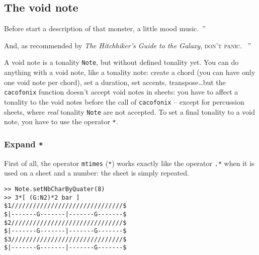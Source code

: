 \documentclass{article}
\newcommand{\note}{\lstinline!Note!\xspace}
\newenvironment{meenv}{ \par \noindent \makebox[6em][r]{ \textcolor{mecolor}{Me}: `` --~}}{~''}
\newenvironment{myselfenv}{ \par \noindent \makebox[6em][r]{ \textcolor{myselfcolor}{Myself}: `` --~}}{~''}
\newcommand{\me}[1]{\begin{meenv}#1\end{meenv}}
\newcommand{\myself}[1]{\begin{myselfenv}#1\end{myselfenv}}
\begin{document}
\subsection{The void note}
\label{sec:VoidNote}

\me{Before start a description of that monster, a little mood music.}

\vspace{ 0.25in }

\begin{center}
\end{center}

\vspace{ 0.25in }

\myself{And, as recommended by \emph{The Hitchhiker's Guide to the Galaxy}, \textsc{don't panic}. \rightthumbsup}

A void note is a tonality \note, but without defined tonality yet. You can do anything with a void note, like a tonality note: create a chord (you can have only one void note per chord), set a duration, set accents, transpose\dots but the \lstinline!cacofonix! function doesn't accept void notes in sheets: you have to affect a tonality to the void notes before the call of \lstinline!cacofonix! -- except for percussion sheets, where \emph{real} tonality \note are not accepted. To set a final tonality to a void note, you have to use the operator \lstinline!*!.

\subsubsection{Expand \lstinline!*!}
\label{sec:Expand}

First of all, the operator \lstinline!mtimes! (\lstinline!*!) works exactly like the operator \lstinline!.*! when it is used on a sheet and a number: the sheet is simply repeated.
\begin{lstlisting}
>> Note.setNbCharByQuater(8)
>> 3*[ (G:N2)*2 bar ]
$1///////////////////////////////$
$|-------G-------|-------G-------$
$2///////////////////////////////$
$|-------G-------|-------G-------$
$3///////////////////////////////$
$|-------G-------|-------G-------$
\end{lstlisting}
\end{document}
